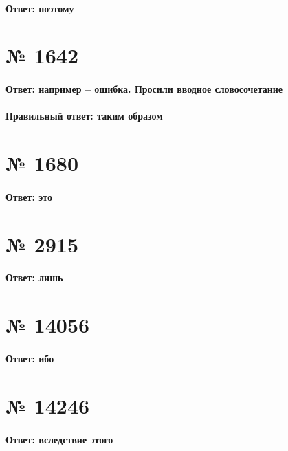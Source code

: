 \documentclass[11pt]{article} %
\begin{document}
\paragraph{Ответ: \textbf{поэтому}}

\section{№ \textbf{1642}}

\paragraph{Ответ: например -- ошибка. Просили вводное словосочетание}

\paragraph{Правильный ответ: \textbf{таким образом}}

\section{№ \textbf{1680}}

\paragraph{Ответ: \textbf{это}}

\section{№ \textbf{2915}}

\paragraph{Ответ: \textbf{лишь}}

\section{№ \textbf{14056}}

\paragraph{Ответ: \textbf{ибо}}

\section{№ \textbf{14246}}

\paragraph{Ответ: \textbf{вследствие этого}}
\end{document}
